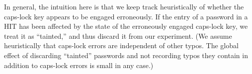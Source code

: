 In general, the intuition here is that we keep track heuristically of whether
the caps-lock key appears to be engaged erroneously. If the entry of a password
in a HIT has been affected by the state of the erroneously engaged caps-lock
key, we treat it as ``tainted,'' and thus discard it from our experiment. (We
assume heuristically that caps-lock errors are independent of other typos. The
global effect of discarding ``tainted'' passwords and not recording typos they
contain in addition to caps-lock errors is small in any case.)



